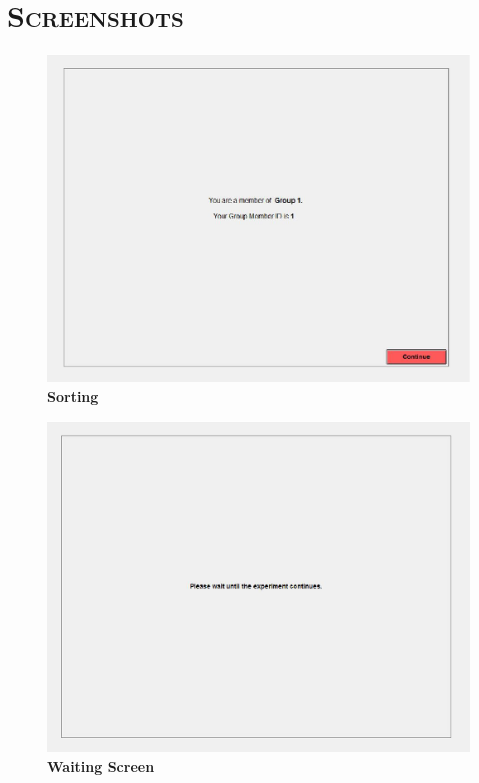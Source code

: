 \documentclass[12pt]{article}
\begin{document}
\thispagestyle{empty}


\section*{\scshape Screenshots}

\centering
\begin{figure}[H]
\includegraphics[width=40pc]{sorting2}
\caption*{\bf Sorting}
\end{figure}

\newpage

\centering
\begin{figure}[H]
\includegraphics[width=40pc]{waitingscreen}
\caption*{\bf Waiting Screen}
\end{figure}
\end{document}
